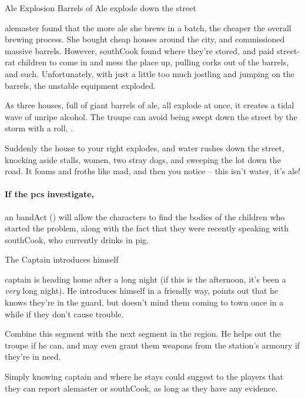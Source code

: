 {Ale Explosion}%
{Barrels of Ale explode down the street}%

\Gls{alemaster} found that the more ale she brews in a batch, the cheaper the overall brewing process.
She bought cheap houses around the city, and commissioned massive barrels.
However, \gls{southCook} found where they're stored, and paid street-rat children to come in and mess the place up, pulling corks out of the barrels, and such.
Unfortunately, with just a little too much jostling and jumping on the barrels, the unstable equipment exploded.

As three houses, full of giant barrels of ale, all explode at once, it creates a tidal wave of unripe alcohol.
The troupe can avoid being swept down the street by the storm with a  roll, \tn[8].

\begin{boxtext}
  Suddenly the house to your right explodes, and water rushes down the street, knocking aside stalls, women, two stray dogs, and sweeping the lot down the road.  It foams and froths like mad, and then you notice -- this isn't water, it's ale!
\end{boxtext}

\paragraph{If the \glspl{pc} investigate,}
an  \gls{bandAct} (\tn[10]) will allow the characters to find the bodies of the children who started the problem, along with the fact that they were recently speaking with \gls{southCook}, who currently drinks in \gls{pig}.

{\squash The Captain}%
{ introduces himself}%

\Gls{captain} is heading home after a long night (if this is the afternoon, it's been a \emph{very} long night).
He introduces himself in a friendly way, points out that he knows they're in the \gls{guard}, but doesn't mind them coming to town once in a while if they don't cause trouble.

Combine this \gls{segment} with the next \gls{segment} in the \gls{region}.
He helps out the troupe if he can, and may even grant them \glspl{weapon} from the station's armoury if they're in need.

\captain

Simply knowing \gls{captain} and where he stays could suggest to the players that they can report \gls{alemaster} or \gls{southCook}, as long as they have any evidence.

